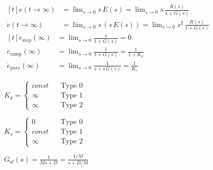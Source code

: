 \documentclass[multi={mymath,myarray},border=1pt]{standalone}
\newenvironment{mymath}{$\displaystyle}{$}
\newenvironment{myarray}{$\begin{aligned}[t]}{\end{aligned}$}
\begin{document}
\begin{myarray}
  e(t \rightarrow \infty) & = \lim_{s \rightarrow 0} s \, E(s) =
  \lim_{s \rightarrow 0} s \, \frac{R(s)}{1 + G(s)} \\
  \dot{e}(t \rightarrow \infty) & = \lim_{s \rightarrow 0} s \,(s \, E(s)) =
  \lim_{s \rightarrow 0} s^2 \, \frac{R(s)}{1 + G(s)} 
\end{myarray}
\begin{myarray}
  \dot{e}_{\text{step}}(\infty) & =  \lim_{s \rightarrow 0}  \frac{s}{1 + G(s)} =
  0 \\
  \dot{e}_{\text{ramp}}(\infty) & =  \lim_{s \rightarrow 0}  \frac{1}{1 + G(s)} =
  \frac{1}{1 + K_p}\\
  \dot{e}_{\text{para}}(\infty) & =  \lim_{s \rightarrow 0}  \frac{1}{s + s\,G(s)} =
  \frac{1}{K_v}
\end{myarray}

\begin{mymath}
  K_p = \left\{
  \begin{matrix}
    const & \:\:\:\:  \text{Type 0} \\
    \infty & \:\:\:\: \text{Type 1} \\
    \infty & \:\:\:\:  \text{Type 2}
  \end{matrix}
  \right.
\end{mymath}


\begin{mymath}
  K_v = \left\{
  \begin{matrix}
    0 & \:\:\:\:  \text{Type 0} \\
    const & \:\:\:\: \text{Type 1} \\
    \infty & \:\:\:\:  \text{Type 2}
  \end{matrix}
  \right.
\end{mymath}

\begin{mymath}
  G_{ol}(s) = \frac{1}{Ms +D} =\frac{1/M}{s+D/M}
\end{mymath}
\end{document}
